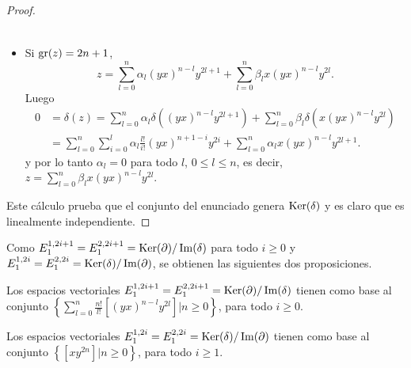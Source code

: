 \documentclass[fleqn,../tesis.tex]{subfiles}
\begin{document}
\begin{proof}
\begin{itemize}
\begin{align*}
            \end{align*}
         \item Si $\operatorname{gr}(z) = 2n + 1$,
         \[
             z= \sum_{l = 0}^{n}\alpha_l(yx)^{n - l}y^{2l + 1}  +\sum_{l = 0}^{n}\beta_l x(yx)^{n - l}y^{2l}.            
         \]
         Luego
         \begin{align*}
              0 &= \delta(z) = \sum_{l = 0}^{n}\alpha_l\delta \left((yx)^{n - l}y^{2l + 1}\right)
                  + \sum_{l = 0}^{n}\beta_l \delta \left( x(yx)^{n - l}y^{2l}\right)\\
                &= \sum_{l = 0}^{n}\sum_{i = 0}^{l}\alpha_l \frac{l!}{i!}(yx)^{n + 1 - i}y^{2i} + \sum_{l = 0}^{n}\alpha_l x(yx)^{n - l}y^{2l + 1}.
         \end{align*}
         y por lo tanto $\alpha_l = 0$ para todo $l$, $0 \leq l \leq n$, es decir,  $z=\sum_{l = 0}^{n}\beta_l x(yx)^{n - l}y^{2l}$.
    \end{itemize}
    Este cálculo prueba que el conjunto del enunciado genera $\operatorname{Ker}(\delta)$ y es claro que es linealmente independiente.
\end{proof}

Como $E_{1}^{1, 2i + 1} = E_{1}^{2, 2i + 1} = \operatorname{Ker}(\partial)/ \operatorname{Im}(\delta)$ para todo $i \geq 0$
y $E_{1}^{1, 2i} = E_{1}^{2, 2i} = \operatorname{Ker}(\delta)/ \operatorname{Im}(\partial)$, se obtienen las siguientes dos proposiciones.

\begin{prop}
    Los espacios vectoriales $E_{1}^{1, 2i + 1} = E_{1}^{2, 2i + 1} = \operatorname{Ker}(\partial)/ \operatorname{Im}(\delta)$ tienen como base
    al conjunto $\left\lbrace \sum_{l = 0}^{n}\frac{n!}{l!}\left[(yx)^{n - l}y^{2l}\right] | n \geq 0 \right\rbrace$, para todo $i \geq 0$.
\end{prop}

\begin{prop}
    Los espacios vectoriales $E_{1}^{1, 2i} = E_{1}^{2, 2i} = \operatorname{Ker}(\delta)/ \operatorname{Im}(\partial)$ tienen como base
    al conjunto $\left\lbrace \left[xy^{2n}\right] | n \geq 0 \right\rbrace$, para todo $i \geq 1$.
\end{prop}
\end{document}
